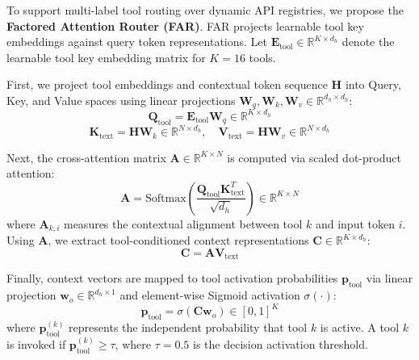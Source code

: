 \documentclass[conference]{IEEEtran}
\begin{document}
To support multi-label tool routing over dynamic API registries, we propose the \textbf{Factored Attention Router (FAR)}. FAR projects learnable tool key embeddings against query token representations. Let $\mathbf{E}_{\text{tool}} \in \mathbb{R}^{K \times d_h}$ denote the learnable tool key embedding matrix for $K=16$ tools.

First, we project tool embeddings and contextual token sequence $\mathbf{H}$ into Query, Key, and Value spaces using linear projections $\mathbf{W}_q, \mathbf{W}_k, \mathbf{W}_v \in \mathbb{R}^{d_h \times d_h}$:
\begin{equation}
    \mathbf{Q}_{\text{tool}} = \mathbf{E}_{\text{tool}} \mathbf{W}_q \in \mathbb{R}^{K \times d_h}
\end{equation}
\begin{equation}
    \mathbf{K}_{\text{text}} = \mathbf{H} \mathbf{W}_k \in \mathbb{R}^{N \times d_h}, \quad \mathbf{V}_{\text{text}} = \mathbf{H} \mathbf{W}_v \in \mathbb{R}^{N \times d_h}
\end{equation}

Next, the cross-attention matrix $\mathbf{A} \in \mathbb{R}^{K \times N}$ is computed via scaled dot-product attention:
\begin{equation}
    \mathbf{A} = \text{Softmax}\left( \frac{\mathbf{Q}_{\text{tool}} \mathbf{K}_{\text{text}}^T}{\sqrt{d_h}} \right) \in \mathbb{R}^{K \times N}
\end{equation}
where $\mathbf{A}_{k, i}$ measures the contextual alignment between tool $k$ and input token $i$. Using $\mathbf{A}$, we extract tool-conditioned context representations $\mathbf{C} \in \mathbb{R}^{K \times d_h}$:
\begin{equation}
    \mathbf{C} = \mathbf{A} \mathbf{V}_{\text{text}}
\end{equation}

Finally, context vectors are mapped to tool activation probabilities $\mathbf{p}_{\text{tool}}$ via linear projection $\mathbf{w}_o \in \mathbb{R}^{d_h \times 1}$ and element-wise Sigmoid activation $\sigma(\cdot)$:
\begin{equation}
    \mathbf{p}_{\text{tool}} = \sigma \left( \mathbf{C} \mathbf{w}_o \right) \in [0, 1]^K
\end{equation}
where $\mathbf{p}_{\text{tool}}^{(k)}$ represents the independent probability that tool $k$ is active. A tool $k$ is invoked if $\mathbf{p}_{\text{tool}}^{(k)} \ge \tau$, where $\tau = 0.5$ is the decision activation threshold.
\end{document}
